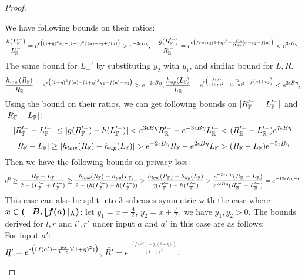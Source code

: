 \documentclass[a4paper,11pt]{article}
\begin{document}
\begin{proof}
\begin{itemize}
		We have following bounds on their ratios:
		\[
		\frac{h(L_{\mathbb{F}}'^-)}{L_{\mathbb{R}}'^-} = e^{\epsilon 
		\big(
		(1 + \eta)^3 v_2 - (1 + \eta)^2f(a) - v_2 + f(a)
		\big)}
		> e^{-3\epsilon B \eta},
		~~~
		\frac{g(R_{\mathbb{F}}'^-)}{R_{\mathbb{R}}'^-} = e^{\epsilon 
		\big(
		frac{v_2}{(1 + \eta)^3} - \frac{f(a)}{(1 + \eta)^2} - v_2 + f(a)
		\big)}
		< e^{3\epsilon B \eta},
		\]
		The same bound for $L_+'$ by substituting $y_2$ with $y_1$, and similar bound for $L, R$.
		\[
		\frac{h_{low}(R_{\mathbb{F}})}{R_{\mathbb{R}}} = e^{\epsilon 
		\big(
		(1 + \eta)^2f(a) - (1 + \eta)^3 y_2 - f(a) + y_2
		\big)}
		> e^{-2\epsilon B \eta},
		\frac{h_{up}(L_{\mathbb{F}})}{L_{\mathbb{R}}} = e^{\epsilon 
		\big(
		\frac{f(a)}{(1 + \eta)^2} - \frac{v_2}{(1 + \eta)^3} - f(a) + v_2
		\big)}
		< e^{2\epsilon B \eta},
		\]
		Using the bound on their ratios, we can get following bounds on 
		$|R_{\mathbb{F}}'^- - L_{\mathbb{F}}'^-|$ 
		and $|R_{\mathbb{F}} - L_{\mathbb{F}} |$:
		\[
		|R_{\mathbb{F}}'^- - L_{\mathbb{F}}'^-|
		\leq
		|g(R_{\mathbb{F}}'^-) - h(L_{\mathbb{F}}'^-)| 
		< e^{3\epsilon B \eta} R_{\mathbb{R}}'^-
		 - e^{-3\epsilon B \eta}L_{\mathbb{R}}'^- 
		 < (R_{\mathbb{R}}'^- - L_{\mathbb{R}}'^-) e^{7\epsilon B \eta}
		 \]
		\[
		|R_{\mathbb{F}} - L_{\mathbb{F}} |
		\geq
		|h_{low}(R_{\mathbb{F}}) - h_{up}(L_{\mathbb{F}})| 
		> e^{-2\epsilon B \eta} R_{\mathbb{F}} - e^{2\epsilon B \eta}L_{\mathbb{F}} 
		> (R_{\mathbb{F}} - L_{\mathbb{F}}) e^{-5\epsilon B \eta}
		\]
		Then we have the following bounds on privacy loss:
		\[
		e^0
		\geq
		\frac{R_{\mathbb{F}} - L_{\mathbb{F}}}
		{2 - (L_{\mathbb{F}}'^+ + L_{\mathbb{F}}'^-)}
		\geq
		\frac{h_{low}(R_{\mathbb{F}}) - h_{up}(L_{\mathbb{F}})}
		{2 - (h(L_{\mathbb{F}}'^+) + h(L_{\mathbb{F}}'^-))}
		> \frac{h_{low}(R_{\mathbb{F}}) - h_{up}(L_{\mathbb{F}})}
		{g(R_{\mathbb{F}}'^-) - h(L_{\mathbb{F}}'^-)}
		> \frac{e^{-5\epsilon B \eta}
		(R_{\mathbb{R}} - L_{\mathbb{R}})}
		{e^{7\epsilon B \eta}
		(R_{\mathbb{R}}'^- - L_{\mathbb{R}}'^-)}
		= e^{-12\epsilon B \eta - \epsilon}
		\]
		This case can also be split into 3 subcases symmetric with the case where $\boldsymbol{x \in  (-B, \lfloor f(a) \rceil_{\Lambda})}$:
		let $y_1 = x - \frac{\Lambda}{2}$, $y_2 = x + \frac{\Lambda}{2}$, we have $y_1, y_2 > 0$. The bounds derived for $l, r$ and $l', r'$ under input $a$ and $a'$ in this case are as follows:
		\\
		For input $a'$:
		\\
		$\ubar{R'} = e^{\epsilon 
				\big( (f(a') - \frac{y_2}{1 + \eta}) (1 + \eta)^2) \big)}$, 
		$\bar{R'} = e^{\epsilon 
				\frac{(f(a') - y_2(1 + \eta))}{(1 + \eta)^2}}$.
		\\

\end{itemize}
\end{proof}
\end{document}
